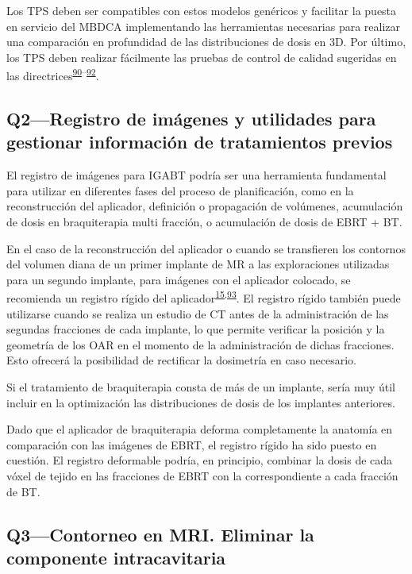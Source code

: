 \documentclass[
  a4paper,
]{scrreprt}
\begin{document}
Los TPS deben ser compatibles con estos modelos genéricos y facilitar la
puesta en servicio del MBDCA implementando las herramientas necesarias
para realizar una comparación en profundidad de las distribuciones de
dosis en 3D. Por último, los TPS deben realizar fácilmente las pruebas
de control de calidad sugeridas en las
directrices\textsuperscript{\protect\hyperlink{ref-nath1997}{90}--\protect\hyperlink{ref-elfrink2002}{92}}.

\hypertarget{sec-q2}{%
\subsection{Q2---Registro de imágenes y utilidades para gestionar
información de tratamientos previos}\label{sec-q2}}

El registro de imágenes para IGABT podría ser una herramienta
fundamental para utilizar en diferentes fases del proceso de
planificación, como en la reconstrucción del aplicador, definición o
propagación de volúmenes, acumulación de dosis en braquiterapia multi
fracción, o acumulación de dosis de EBRT + BT.

En el caso de la reconstrucción del aplicador o cuando se transfieren
los contornos del volumen diana de un primer implante de MR a las
exploraciones utilizadas para un segundo implante, para imágenes con el
aplicador colocado, se recomienda un registro rígido del
aplicador\textsuperscript{\protect\hyperlink{ref-ICRU38}{15},\protect\hyperlink{ref-swamidas2020}{93}}.
El registro rígido también puede utilizarse cuando se realiza un estudio
de CT antes de la administración de las segundas fracciones de cada
implante, lo que permite verificar la posición y la geometría de los OAR
en el momento de la administración de dichas fracciones. Esto ofrecerá
la posibilidad de rectificar la dosimetría en caso necesario.

Si el tratamiento de braquiterapia consta de más de un implante, sería
muy útil incluir en la optimización las distribuciones de dosis de los
implantes anteriores.

Dado que el aplicador de braquiterapia deforma completamente la anatomía
en comparación con las imágenes de EBRT, el registro rígido ha sido
puesto en cuestión. El registro deformable podría, en principio,
combinar la dosis de cada vóxel de tejido en las fracciones de EBRT con
la correspondiente a cada fracción de BT.

\hypertarget{sec-q3}{%
\subsection{Q3---Contorneo en MRI. Eliminar la componente
intracavitaria}\label{sec-q3}}
\end{document}
